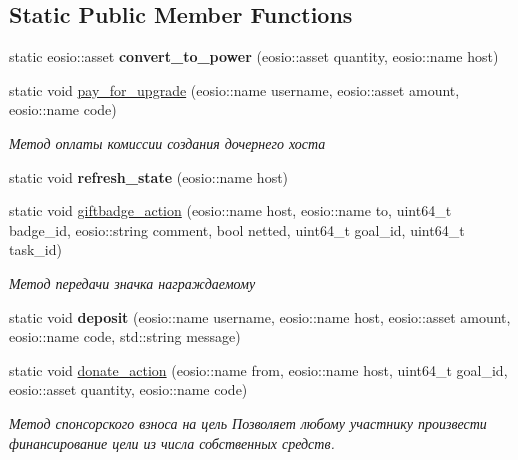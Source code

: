 \subsection*{Static Public Member Functions}
\begin{DoxyCompactItemize}
\item 
\mbox{\label{classunicore_a739255f27ec8bb084f76fcb8cd5c33d8}} 
static eosio\+::asset {\bfseries convert\+\_\+to\+\_\+power} (eosio\+::asset quantity, eosio\+::name host)
\item 
static void \mbox{\hyperlink{classunicore_a4f4a69c310c073c6cf1ebf41f2c210e8}{pay\+\_\+for\+\_\+upgrade}} (eosio\+::name username, eosio\+::asset amount, eosio\+::name code)
\begin{DoxyCompactList}\small\item\em Метод оплаты комиссии создания дочернего хоста \end{DoxyCompactList}\item 
\mbox{\label{classunicore_a8703f9141c36861284ca003a348b61d0}} 
static void {\bfseries refresh\+\_\+state} (eosio\+::name host)
\item 
static void \mbox{\hyperlink{classunicore_a5e0d285466d37fa9f315b5a52dba4c8a}{giftbadge\+\_\+action}} (eosio\+::name host, eosio\+::name to, uint64\+\_\+t badge\+\_\+id, eosio\+::string comment, bool netted, uint64\+\_\+t goal\+\_\+id, uint64\+\_\+t task\+\_\+id)
\begin{DoxyCompactList}\small\item\em Метод передачи значка награждаемому \end{DoxyCompactList}\item 
\mbox{\label{classunicore_ac1a80266ee2fcc4565d3e0924eaf2c60}} 
static void {\bfseries deposit} (eosio\+::name username, eosio\+::name host, eosio\+::asset amount, eosio\+::name code, std\+::string message)
\item 
static void \mbox{\hyperlink{classunicore_a466aba74657c6022cc0d9163bd502625}{donate\+\_\+action}} (eosio\+::name from, eosio\+::name host, uint64\+\_\+t goal\+\_\+id, eosio\+::asset quantity, eosio\+::name code)
\begin{DoxyCompactList}\small\item\em Метод спонсорского взноса на цель Позволяет любому участнику произвести финансирование цели из числа собственных средств. \end{DoxyCompactList}\item 

\end{DoxyCompactItemize}
